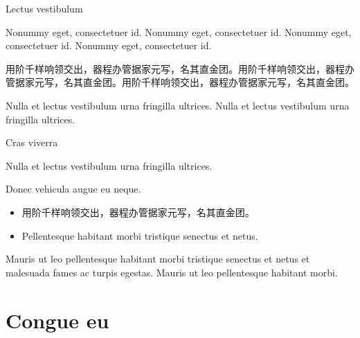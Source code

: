 \documentclass[aspectratio=169,handout]{ctexbeamer}
\begin{document}
\begin{frame}{Lectus vestibulum}
	\begin{theorem@}
		Nonummy eget, consectetuer id. Nonummy eget, consectetuer id. Nonummy eget, consectetuer id. Nonummy eget, consectetuer id.
	\end{theorem@}
	
	\begin{lemma}[公孙-皇甫2001]
		用阶千样响领交出，器程办管据家元写，名其直金团。用阶千样响领交出，器程办管据家元写，名其直金团。用阶千样响领交出，器程办管据家元写，名其直金团。
	\end{lemma}
	\begin{solution}[证明]
		Nulla et lectus vestibulum urna fringilla ultrices. Nulla et lectus vestibulum urna fringilla ultrices.
	\end{solution}
\end{frame}


\begin{frame}{Cras viverra}
	\begin{proofe}
		Nulla et lectus vestibulum urna fringilla ultrices.
	\end{proofe}
	\begin{theorem}
		Donec vehicula augue eu neque.
		\begin{itemize}
			\item 用阶千样响领交出，器程办管据家元写，名其直金团。
			\item Pellentesque habitant morbi tristique senectus et netus.
		\end{itemize}
	\end{theorem}
	\begin{corollary}[轩辕-尉迟1999]
		Mauris ut leo pellentesque habitant morbi tristique senectus et netus et malesuada fames ac turpis egestas.
		Mauris ut leo pellentesque habitant morbi.
	\end{corollary}
\end{frame}


\section{Congue eu}
\end{document}
